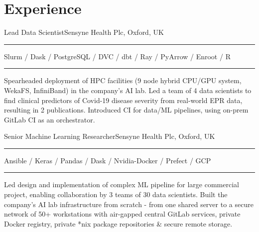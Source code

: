 \documentclass[letterpaper]{twentysecondcv} %
\begin{document}

\section{Experience}

\begin{twenty} %
           {Lead Data Scientist}{Sensyne Health Plc, Oxford, UK}{\rule{305pt}{1pt} \small Slurm / Dask / PostgreSQL / DVC / dbt / Ray / PyArrow / Enroot / R  \newline \rule{305pt}{1pt} \footnotesize Spearheaded deployment of HPC facilities (9 node hybrid CPU/GPU system, WekaFS, InfiniBand) in the company's AI lab. \newline Led a team of 4 data scientists to find clinical predictors of Covid-19 disease severity from real-world EPR data, resulting in 2 publications. \newline Introduced CI for data/ML pipelines, using on-prem GitLab CI as an orchestrator.}
	 {Senior Machine Learning Researcher}{Sensyne Health Plc, Oxford, UK}{\rule{305pt}{1pt} \small Ansible / Keras / Pandas / Dask / Nvidia-Docker / Prefect / GCP \newline \rule{305pt}{1pt} \footnotesize Led design and implementation of complex ML pipeline for large commercial  project, enabling collaboration by 3 teams of 30 data scientists. \newline Built the company's AI lab infrastructure from scratch - from one shared server to a secure network of 50+ workstations with air-gapped central GitLab services, private Docker registry, private *nix package repositories \& secure remote storage.}

\end{twenty}
\end{document}
